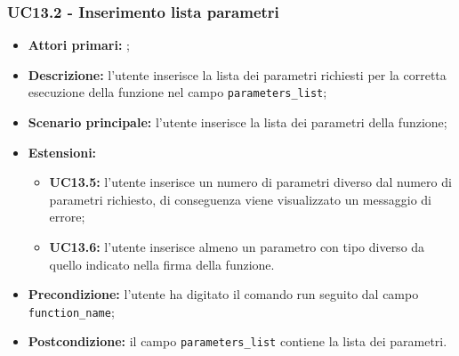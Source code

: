 \subsubsection{UC13.2 - Inserimento lista parametri}
\begin{itemize}
	\item \textbf{Attori primari:} \ua{};
	\item \textbf{Descrizione:} l’utente inserisce la lista dei parametri richiesti per la corretta esecuzione della funzione nel campo \texttt{parameters\_list};
	\item \textbf{Scenario principale:}  l'utente inserisce la lista dei parametri della funzione; 
	\item \textbf{Estensioni:} 
	\begin{itemize}
		\item \textbf{UC13.5:}  l’utente inserisce un numero di parametri diverso dal numero di parametri richiesto, di conseguenza viene visualizzato un messaggio di errore; 
		\item \textbf{UC13.6:} l'utente inserisce almeno un parametro con tipo diverso da quello indicato nella firma della funzione.
	\end{itemize}
	\item \textbf{Precondizione:} l’utente ha digitato il comando run seguito dal campo \texttt{function\_name};
	\item \textbf{Postcondizione:} il campo \texttt{parameters\_list} contiene la lista dei parametri.
\end{itemize}
